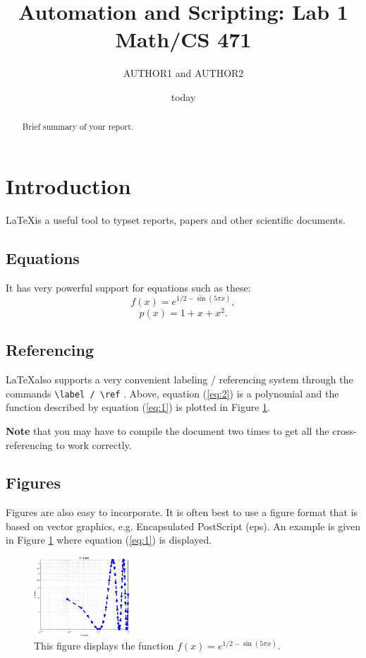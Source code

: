 \documentclass[12pt]{article}
\title{Automation and Scripting: Lab 1 Math/CS 471}
\author{AUTHOR1 and AUTHOR2}
\date{today}   %
\begin{document}
\maketitle

\begin{abstract}
Brief summary of your report.
\end{abstract}
\section{Introduction}
\LaTeX is a useful tool to typset reports, papers and other
scientific documents. 

\subsection{Equations}
It has very powerful support for equations such
as these:
\begin{equation}
f(x) = e^{1/2 - \sin(5 \pi    x)}, \label{eq:1} 
\end{equation}
\begin{equation}
p(x) = 1+x+x^2. \label{eq:2} 
\end{equation}

\subsection{Referencing}
\LaTeX also supports a very convenient labeling / referencing system
through the commands \verb+\label / \ref+ . Above, equation
(\ref{eq:2}) is a polynomial and the function described by equation
(\ref{eq:1}) is plotted in Figure \ref{fig:1}. 

{\bf Note} that you may have to compile the document two times to get
all the cross-referencing to work correctly.

\subsection{Figures}
Figures are also easy to incorporate. It is often best to use a figure
format that is based on vector graphics, e.g. Encapsulated PostScript
(eps). An example is given in Figure \ref{fig:1} where equation
(\ref{eq:1}) is displayed.

\begin{figure}[htb]
\begin{center}
\includegraphics[width=0.32\textwidth]{lab1.eps}
\caption{This figure displays the function $f(x) = e^{1/2 - \sin(5 \pi
    x)}$. \label{fig:1}}
\end{center}
\end{figure}
\end{document}
